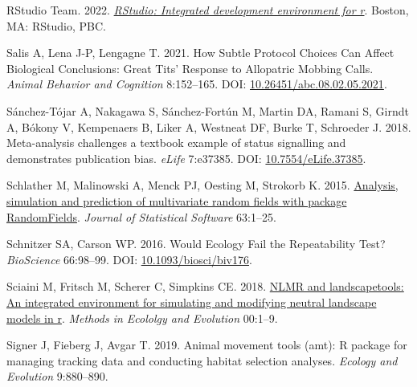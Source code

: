 \documentclass[10pt,a4paper]{article}
\newlength{\cslhangindent}
\newenvironment{CSLReferences}[2] %
 {\begin{list}{}{%
  \setlength{\itemindent}{0pt}
  \setlength{\leftmargin}{0pt}
  \setlength{\parsep}{0pt}
  \ifodd #1
   \setlength{\leftmargin}{\cslhangindent}
   \setlength{\itemindent}{-1\cslhangindent}
  \fi
  \setlength{\itemsep}{#2\baselineskip}}}
 {\end{list}}
\begin{document}
\begin{CSLReferences}{1}{0}
RStudio Team. 2022. \emph{\href{http://www.rstudio.com/}{{RStudio}: Integrated development environment for r}}. Boston, MA: RStudio, PBC.

Salis A, Lena J-P, Lengagne T. 2021. How {Subtle} {Protocol} {Choices} {Can} {Affect} {Biological} {Conclusions}: {Great} {Tits}' {Response} to {Allopatric} {Mobbing} {Calls}. \emph{Animal Behavior and Cognition} 8:152--165. DOI: \href{https://doi.org/10.26451/abc.08.02.05.2021}{10.26451/abc.08.02.05.2021}.

Sánchez-Tójar A, Nakagawa S, Sánchez-Fortún M, Martin DA, Ramani S, Girndt A, Bókony V, Kempenaers B, Liker A, Westneat DF, Burke T, Schroeder J. 2018. Meta-analysis challenges a textbook example of status signalling and demonstrates publication bias. \emph{eLife} 7:e37385. DOI: \href{https://doi.org/10.7554/eLife.37385}{10.7554/eLife.37385}.

Schlather M, Malinowski A, Menck PJ, Oesting M, Strokorb K. 2015. \href{https://www.jstatsoft.org/v63/i08/}{Analysis, simulation and prediction of multivariate random fields with package {RandomFields}}. \emph{Journal of Statistical Software} 63:1--25.

Schnitzer SA, Carson WP. 2016. Would {Ecology} {Fail} the {Repeatability} {Test}? \emph{BioScience} 66:98--99. DOI: \href{https://doi.org/10.1093/biosci/biv176}{10.1093/biosci/biv176}.

Sciaini M, Fritsch M, Scherer C, Simpkins CE. 2018. \href{https://doi.org/10.1111/2041-210X.13076}{NLMR and landscapetools: An integrated environment for simulating and modifying neutral landscape models in r}. \emph{Methods in Ecololgy and Evolution} 00:1--9.

Signer J, Fieberg J, Avgar T. 2019. Animal movement tools (amt): R package for managing tracking data and conducting habitat selection analyses. \emph{Ecology and Evolution} 9:880--890.


\end{CSLReferences}
\end{document}
